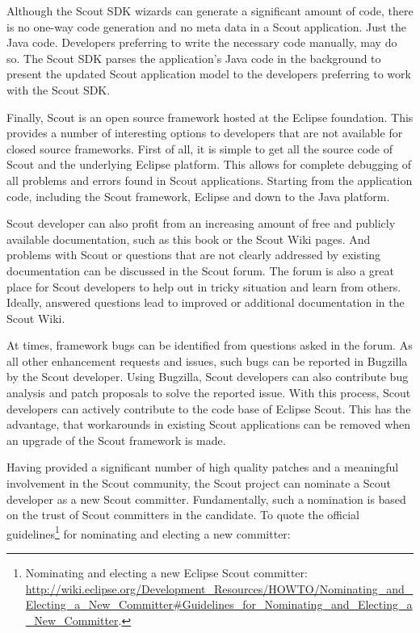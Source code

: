 \documentclass[a4paper,10pt,twoside]{book}
\begin{document}
Although the Scout SDK wizards can generate a significant amount of code, there is no one-way code generation and no meta data in a Scout application.
Just the Java code. 
Developers preferring to write the necessary code manually, may do so. 
The Scout SDK parses the application's Java code in the background to present the updated Scout application model to the developers preferring to work with the Scout SDK. 


Finally, Scout is an open source framework hosted at the Eclipse foundation. 
This provides a number of interesting options to developers that are not available for closed source frameworks. 
First of all, it is simple to get all the source code of Scout and the underlying Eclipse platform. 
This allows for complete debugging of all problems and errors found in Scout applications. 
Starting from the application code, including the Scout framework, Eclipse and down to the Java platform. 

Scout developer can also profit from an increasing amount of free and publicly available documentation, such as this book or the Scout Wiki pages. 
And problems with Scout or questions that are not clearly addressed by existing documentation can be discussed in the Scout forum. 
The forum is also a great place for Scout developers to help out in tricky situation and learn from others. 
Ideally, answered questions lead to improved or additional documentation in the Scout Wiki.

At times, framework bugs can be identified from questions asked in the forum. 
As all other enhancement requests and issues, such bugs can be reported in Bugzilla by the Scout developer. 
Using Bugzilla, Scout developers can also contribute bug analysis and patch proposals to solve the reported issue.
With this process, Scout developers can actively contribute to the code base of Eclipse Scout.
This has the advantage, that workarounds in existing Scout applications can be removed when an upgrade of the Scout framework is made.

Having provided a significant number of high quality patches and a meaningful involvement in the Scout community, the Scout project can nominate a Scout developer as a new Scout committer. 
Fundamentally, such a nomination is based on the trust of Scout committers in the candidate. 
To quote the official guidelines\footnote{
Nominating and electing a new Eclipse Scout committer: \url{http://wiki.eclipse.org/Development_Resources/HOWTO/Nominating_and_Electing_a_New_Committer#Guidelines_for_Nominating_and_Electing_a_New_Committer}.
} 
for nominating and electing a new committer:
\end{document}
